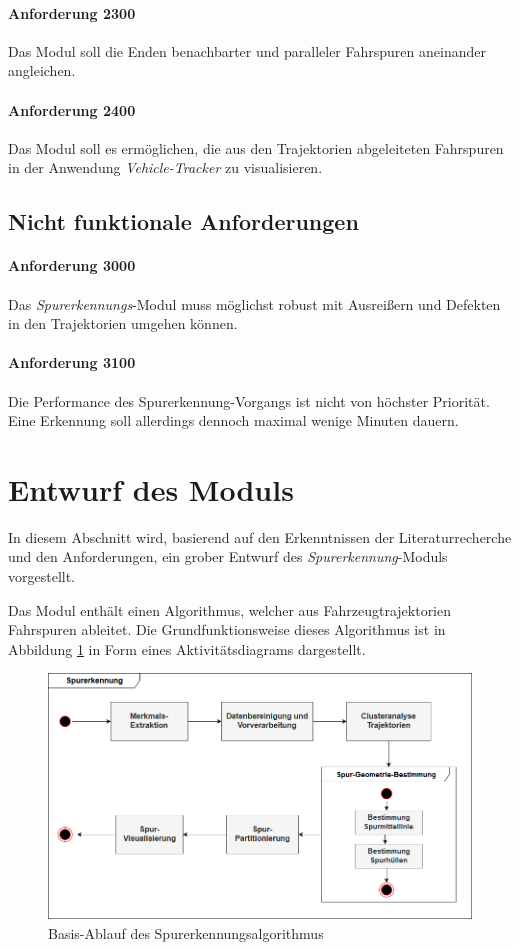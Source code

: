 \paragraph{Anforderung 2300}
Das Modul soll die Enden benachbarter und paralleler Fahrspuren aneinander angleichen.

\paragraph{Anforderung 2400}
Das Modul soll es ermöglichen, die aus den Trajektorien abgeleiteten Fahrspuren in der Anwendung \textit{Vehicle-Tracker}
zu visualisieren.

\subsection{Nicht funktionale Anforderungen}

\paragraph{Anforderung 3000}
Das \textit{Spurerkennungs}-Modul muss möglichst robust mit Ausreißern und Defekten in den Trajektorien umgehen können.

\paragraph{Anforderung 3100}
Die Performance des Spurerkennung-Vorgangs ist nicht von höchster Priorität. Eine Erkennung soll allerdings
dennoch maximal wenige Minuten dauern.

\section{Entwurf des Moduls}
\label{sec:design}

In diesem Abschnitt wird, basierend auf den Erkenntnissen der Literaturrecherche und den Anforderungen,
ein grober Entwurf des \textit{Spurerkennung}-Moduls vorgestellt.

Das Modul enthält einen Algorithmus, welcher aus Fahrzeugtrajektorien Fahrspuren ableitet.
Die Grundfunktionsweise dieses Algorithmus ist in Abbildung \ref{fig:concept_laneDetection_activity}
in Form eines Aktivitätsdiagrams dargestellt.

\begin{figure}[H]
    \centering
    \includegraphics[width=0.8\linewidth]{resources/img/konzeption/activity_laneDetection}
    \caption{Basis-Ablauf des Spurerkennungsalgorithmus}
    \label{fig:concept_laneDetection_activity}
\end{figure}


